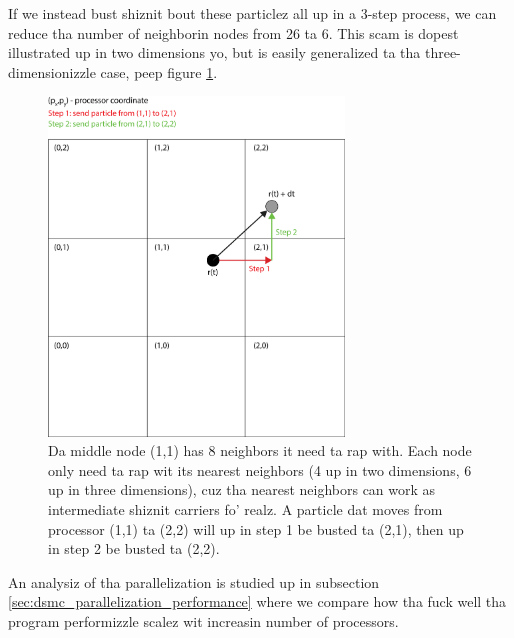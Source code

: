 If we instead bust shiznit bout these particlez all up in a 3-step process, we can reduce tha number of neighborin nodes from 26 ta 6. This scam is dopest illustrated up in two dimensions yo, but is easily generalized ta tha three-dimensionizzle case, peep figure \ref{fig:parallelization_facet_technique}.
\begin{figure}[htpb]
\begin{center}
\includegraphics[width=0.7\textwidth, trim=0cm 0cm 0cm 0cm, clip]{DSMC/figures/parallelization_facet_technique.eps}
\end{center}
\caption{Da middle node (1,1) has 8 neighbors it need ta rap with. Each node only need ta rap wit its nearest neighbors (4 up in two dimensions, 6 up in three dimensions), cuz tha nearest neighbors can work as intermediate shiznit carriers fo' realz. A particle dat moves from processor (1,1) ta (2,2) will up in step 1 be busted ta (2,1), then up in step 2 be busted ta (2,2).}
\label{fig:parallelization_facet_technique}
\end{figure}
An analysiz of tha parallelization is studied up in subsection \ref{sec:dsmc_parallelization_performance} where we compare how tha fuck well tha program performizzle scalez wit increasin number of processors. 